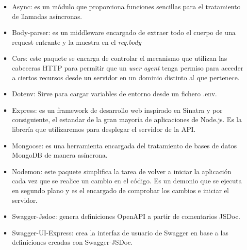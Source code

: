 \begin{itemize}
    \item Async: es un módulo que proporciona funciones sencillas para el tratamiento de llamadas asíncronas.
    \item Body-parser: es un middleware encargado de extraer todo el cuerpo de una request entrante y la muestra en el \textit{req.body} 
    \item Cors: este paquete se encarga de controlar el mecanismo que utilizan las cabeceras HTTP para permitir que un \textit{user agent} tenga permiso para acceder a ciertos recursos desde un servidor en un dominio distinto al que pertenece.
    \item Dotenv: Sirve para cargar variables de entorno desde un fichero .env.
    \item Express: es un framework de desarrollo web inspirado en Sinatra y por consiguiente, el estandar de la gran mayoría de aplicaciones de Node.js. Es la librería que utilizaremos para desplegar el servidor de la API.  
    \item Mongoose: es una herramienta encargada del tratamiento de bases de datos MongoDB de manera asíncrona.
    \item Nodemon: este paquete simplifica la tarea de volver a iniciar la aplicación cada vez que se realice un cambio en el código. Es un demonio que se ejecuta en segundo plano y es el encargado de comprobar los cambios e iniciar el servidor.
    \item Swagger-Jsdoc: genera definiciones OpenAPI a partir de comentarios JSDoc.
    \item Swagger-UI-Express: crea la interfaz de usuario de Swagger en base a las definiciones creadas con Swagger-JSDoc.
\end{itemize}